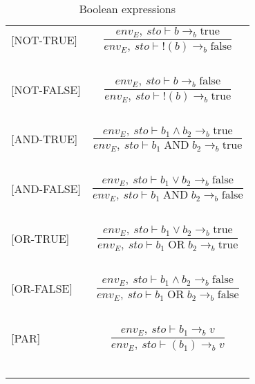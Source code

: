 \begin{longtable}{l l}
[NOT-TRUE] & \[\frac{env_E, \: sto \vdash b \rightarrow_b \text{true}}{env_E, \: sto \vdash !(b)  \rightarrow_b \text{false}}\] \\
~ & ~ \\

[NOT-FALSE] & \[\frac{env_E, \: sto \vdash b \rightarrow_b \text{false}}{env_E, \: sto \vdash !(b)  \rightarrow_b \text{true}}\] \\
~ & ~ \\

[AND-TRUE] & \[\frac{env_E, \: sto \vdash b_1 \wedge b_2 \rightarrow_b \text{true}}{env_E, \: sto \vdash b_1  \; \text{AND} \; b_2 \rightarrow_b \text{true}}\] \\
~ & ~ \\

[AND-FALSE] & \[\frac{env_E, \: sto \vdash b_1 \vee b_2 \rightarrow_b \text{false}}{env_E, \: sto \vdash b_1  \; \text{AND} \; b_2 \rightarrow_b \text{false}}\] \\
~ & ~ \\

[OR-TRUE] & \[\frac{env_E, \: sto \vdash b_1 \vee b_2 \rightarrow_b \text{true}}{env_E, \: sto \vdash b_1  \; \text{OR} \; b_2 \rightarrow_b \text{true}}\] \\
~ & ~ \\

[OR-FALSE] & \[\frac{env_E, \: sto \vdash b_1 \wedge b_2 \rightarrow_b \text{false}}{env_E, \: sto \vdash b_1  \; \text{OR} \; b_2 \rightarrow_b \text{false}}\] \\
~ & ~ \\

[PAR] & \[\frac{env_E, \: sto \vdash b_1 \rightarrow_b v}{env_E, \: sto \vdash (b_1) \rightarrow_b v}\] \\
~ & ~ \\


\caption{Boolean expressions}
\end{longtable}




